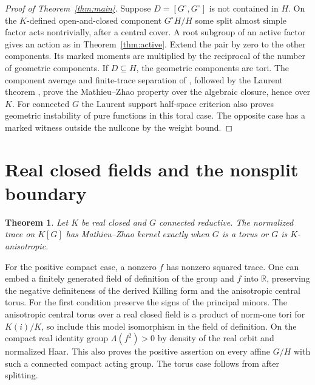 \documentclass[11pt]{article}
\newtheorem{theorem}{Theorem}[section]
\newcommand{\RR}{\mathbb R}
\begin{document}
\begin{proof}[Proof of Theorem~\ref{thm:main}]
Suppose \(D=[G^\circ,G^\circ]\) is not contained in \(H\). On the
\(K\)-defined open-and-closed component \(G^\circ H/H\) some split
almost simple factor acts nontrivially, after a central cover.
A root subgroup of an active factor gives an action as in
Theorem~\ref{thm:active}. Extend the pair by zero to the other
components. Its marked moments are multiplied by the reciprocal
of the number of geometric components. If \(D\subseteq H\), the
geometric components are tori. The component average and
finite-trace separation of \cite[Section~7]{Complex}, followed
by the Laurent theorem \cite{DvK}, prove the Mathieu--Zhao property
over the algebraic closure, hence over \(K\). For connected \(G\)
the Laurent support half-space criterion also proves geometric
instability of pure functions in this toral case. The opposite
case has a marked witness outside the nullcone by the weight bound.
\end{proof}

\section{Real closed fields and the nonsplit boundary}\label{sec:real}

\begin{theorem}\label{thm:realgroup}
Let \(K\) be real closed and \(G\) connected reductive. The normalized
trace on \(K[G]\) has Mathieu--Zhao kernel exactly when \(G\) is a torus
or \(G\) is \(K\)-anisotropic.
\end{theorem}

For the positive compact case, a nonzero \(f\) has nonzero squared
trace. One can embed a finitely generated field of definition of the
group and \(f\) into \(\RR\), preserving the negative definiteness of
the derived Killing form and the anisotropic central torus. For the
first condition preserve the signs of the principal minors. The
anisotropic central torus over a real closed field is a product of
norm-one tori for \(K(i)/K\), so include this model isomorphism in
the field of definition. On the compact real identity group
\(\Lambda(f^2)>0\) by density of the real orbit and normalized Haar.
This also proves the positive assertion on every affine \(G/H\) with
such a connected compact acting group. The torus case follows from
\cite{DvK} after splitting.
\end{document}
